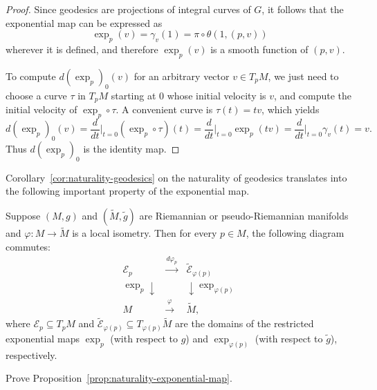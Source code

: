 \begin{proposition}
\begin{proof}

Since geodesics are projections of integral curves of $G$, it follows that the exponential map can be expressed as
\[
\exp_p(v) = \gamma_v(1) = \pi \circ \theta(1,(p,v))
\]
wherever it is defined, and therefore $\exp_p(v)$ is a smooth function of $(p,v)$.

To compute $d(\exp_p)_0(v)$ for an arbitrary vector $v \in T_pM$, we just need to choose a curve $\tau$ in $T_pM$ starting at $0$ whose initial velocity is $v$, and compute the initial velocity of $\exp_p \circ \tau$. A convenient curve is $\tau(t) = tv$, which yields
\[
d(\exp_p)_0(v) = \frac{d}{dt}\bigg|_{t=0} (\exp_p \circ \tau)(t) = \frac{d}{dt}\bigg|_{t=0} \exp_p(tv) = \frac{d}{dt}\bigg|_{t=0} \gamma_v(t) = v.
\]
Thus $d(\exp_p)_0$ is the identity map.
\end{proof}
\end{proposition}

Corollary~\ref{cor:naturality-geodesics} on the naturality of geodesics translates into the following important property of the exponential map.

\begin{proposition}
\label{prop:naturality-exponential-map}

Suppose $(M,g)$ and $(\tilde{M},\tilde{g})$ are Riemannian or pseudo-Riemannian manifolds and $\varphi: M \to \tilde{M}$ is a local isometry. Then for every $p \in M$, the following diagram commutes:
\[
\begin{array}{ccc}
\mathcal{E}_p & \xrightarrow{\ d\varphi_p\ } & \tilde{\mathcal{E}}_{\varphi(p)} \\
{\scriptstyle \exp_p}\downarrow & & \downarrow{\scriptstyle \exp_{\varphi(p)}} \\
M & \xrightarrow{\ \varphi\ } & \tilde{M},
\end{array}
\]
where $\mathcal{E}_p \subseteq T_p M$ and $\tilde{\mathcal{E}}_{\varphi(p)} \subseteq T_{\varphi(p)}\tilde{M}$ are the domains of the restricted exponential maps $\exp_p$ (with respect to $g$) and $\exp_{\varphi(p)}$ (with respect to $\tilde{g}$), respectively.
\end{proposition}

\begin{exercise}
\label{exer:prove-proposition-5-20}

Prove Proposition~\ref{prop:naturality-exponential-map}.
\end{exercise}

